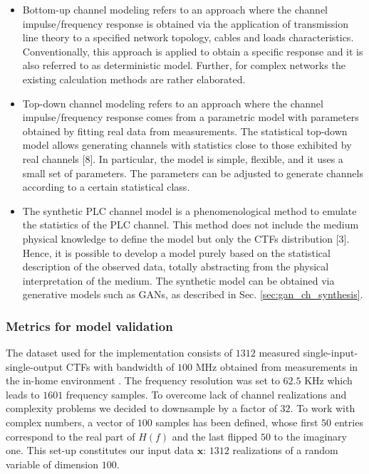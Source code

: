 \begin{itemize}
    \item Bottom-up channel modeling refers to an approach where the channel impulse/frequency response is obtained via the application of transmission line theory to a specified network topology, cables and loads characteristics. Conventionally, this approach is applied to obtain a specific response and it is also referred to as deterministic model. Further, for complex networks the existing calculation methods are rather elaborated. 
    \item Top-down channel modeling refers to an approach where the channel impulse/frequency response comes from a parametric model with parameters obtained by fitting real data from measurements. The statistical top-down model allows generating channels with statistics close to those exhibited by real channels [8]. In particular, the model is simple, flexible, and it uses a small set of parameters. The parameters can be adjusted to generate channels according to a certain statistical class.
    \item The synthetic PLC channel model is a phenomenological method to emulate the statistics of the PLC channel. This method does not include the medium physical knowledge to define the model but only the CTFs distribution [3]. Hence, it is possible to develop a model purely based on the statistical description of the observed data, totally abstracting from the physical interpretation of the medium. The synthetic model can be obtained via generative models such as GANs, as described in Sec. \ref{sec:gan_ch_synthesis}.
\end{itemize}

\subsubsection{Metrics for model validation}
The dataset used for the implementation consists of $1312$
measured single-input-single-output CTFs with bandwidth of
$100$ MHz obtained from measurements in the in-home environment
\cite{tonello2014inhome}. The frequency resolution was set to $62.5$
KHz which leads to $1601$ frequency samples. To overcome
lack of channel realizations and complexity problems we
decided to downsample by a factor of $32$. To work with
complex numbers, a vector of $100$ samples has been defined,
whose first $50$ entries correspond to the real part of $H(f)$ and the last flipped $50$ to the imaginary one. This set-up constitutes our input data $\mathbf{x}$: $1312$ realizations of a random variable of dimension $100$.

